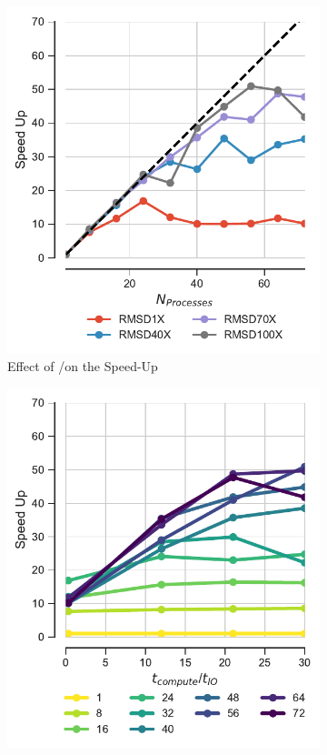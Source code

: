 \begin{figure}[ht!]
\centering
\begin{subfigure} {.3\textwidth}
  \includegraphics[width=\linewidth]{figures/Compute_to_IO_ratio_on_performance_2d_v17.pdf}
  \caption{Effect of \tcomp/\tIO on the Speed-Up}
  \label{fig:S1_tcomp_tIO_effect}
\end{subfigure}
\hfill
\begin{subfigure}{.3\textwidth}
  \includegraphics[width=\linewidth]{figures/Compute_to_IO_ratio_on_performance_2d_2_v17.pdf}

\end{subfigure}
\end{figure}
